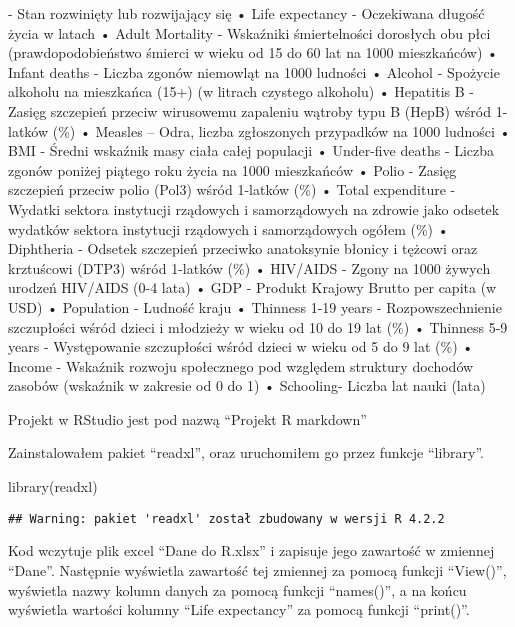 \documentclass[
]{article}
\newenvironment{Shaded}{\begin{snugshade}}{\end{snugshade}}
\newcommand{\FunctionTok}[1]{\textcolor[rgb]{0.00,0.00,0.00}{#1}}
\newcommand{\NormalTok}[1]{#1}
\begin{document}
- Stan rozwinięty lub rozwijający się • Life expectancy - Oczekiwana
długość życia w latach • Adult Mortality - Wskaźniki śmiertelności
dorosłych obu płci (prawdopodobieństwo śmierci w wieku od 15 do 60 lat
na 1000 mieszkańców) • Infant deaths - Liczba zgonów niemowląt na 1000
ludności • Alcohol - Spożycie alkoholu na mieszkańca (15+) (w litrach
czystego alkoholu) • Hepatitis B - Zasięg szczepień przeciw wirusowemu
zapaleniu wątroby typu B (HepB) wśród 1-latków (\%) • Measles -- Odra,
liczba zgłoszonych przypadków na 1000 ludności • BMI - Średni wskaźnik
masy ciała całej populacji • Under-five deaths - Liczba zgonów poniżej
piątego roku życia na 1000 mieszkańców • Polio - Zasięg szczepień
przeciw polio (Pol3) wśród 1-latków (\%) • Total expenditure - Wydatki
sektora instytucji rządowych i samorządowych na zdrowie jako odsetek
wydatków sektora instytucji rządowych i samorządowych ogółem (\%) •
Diphtheria - Odsetek szczepień przeciwko anatoksynie błonicy i tężcowi
oraz krztuścowi (DTP3) wśród 1-latków (\%) • HIV/AIDS - Zgony na 1000
żywych urodzeń HIV/AIDS (0-4 lata) • GDP - Produkt Krajowy Brutto per
capita (w USD) • Population - Ludność kraju • Thinness 1-19 years -
Rozpowszechnienie szczupłości wśród dzieci i młodzieży w wieku od 10 do
19 lat (\%) • Thinness 5-9 years - Występowanie szczupłości wśród dzieci
w wieku od 5 do 9 lat (\%) • Income - Wskaźnik rozwoju społecznego pod
względem struktury dochodów zasobów (wskaźnik w zakresie od 0 do 1) •
Schooling- Liczba lat nauki (lata)

Projekt w RStudio jest pod nazwą ``Projekt R markdown''

Zainstalowałem pakiet ``readxl'', oraz uruchomiłem go przez funkcje
``library''.

\begin{Shaded}
\begin{Highlighting}[]
\FunctionTok{library}\NormalTok{(readxl)}
\end{Highlighting}
\end{Shaded}

\begin{verbatim}
## Warning: pakiet 'readxl' został zbudowany w wersji R 4.2.2
\end{verbatim}

Kod wczytuje plik excel ``Dane do R.xlsx'' i zapisuje jego zawartość w
zmiennej ``Dane''. Następnie wyświetla zawartość tej zmiennej za pomocą
funkcji ``View()'', wyświetla nazwy kolumn danych za pomocą funkcji
``names()'', a na końcu wyświetla wartości kolumny ``Life expectancy''
za pomocą funkcji ``print()''.
\end{document}
